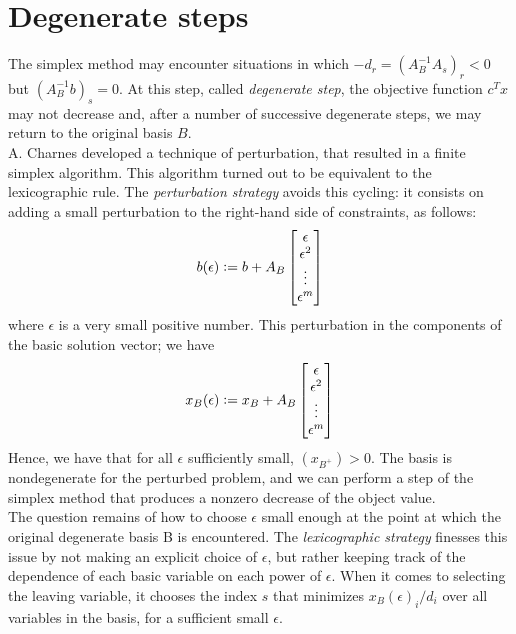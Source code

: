 \documentclass[a4paper,10 pt,titlepage,twoside]{book}
\theoremstyle{plain}
\theoremstyle{definition}
\theoremstyle{remark}
\begin{document}
 \section{Degenerate steps}
The simplex method may encounter situations in which $-d_{r} = \left( A_{B}^{-1}A_{s}\right)_{r} < 0$ but $(A_{B}^{-1}b)_{s}= 0$. At this step, called \textit{degenerate step}, the objective function $c^{T}x$ may not decrease and, after a number of successive degenerate steps, we may return to the original basis $B$. \\
A. Charnes \cite{Lexico2} developed a technique of perturbation, that resulted in a finite simplex algorithm. This algorithm turned out to be equivalent to the lexicographic rule. The \textit{perturbation strategy} avoids this cycling: it consists on adding a small perturbation to the right-hand side of constraints, as follows:
\begin{equation*}
b(\epsilon) \vcentcolon= b + A_{B}
\begin{bmatrix}
\epsilon\\\epsilon^{2}\\\vdots\\\epsilon^{m}
\end{bmatrix}
\end{equation*}
where $\epsilon$ is a very small positive number. This perturbation in the components of the basic solution vector; we have
\begin{equation*}x_{B}(\epsilon) \vcentcolon= x_{B} + A_{B}
\begin{bmatrix}
\epsilon\\\epsilon^{2}\\\vdots\\\epsilon^{m}
\end{bmatrix}
\end{equation*}
Hence, we have that for all $\epsilon$ sufficiently small, $(x_{B^{+}})>0$. The basis is nondegenerate for the perturbed problem, and we can perform a step of the simplex method that produces a nonzero decrease of the object value.\\
The question remains of how to choose $\epsilon$ small enough at the point at which the original degenerate basis B is encountered. The \textit{lexicographic strategy} finesses this issue by not making an explicit choice of $\epsilon$, but rather keeping track of the dependence of each basic variable on each power of $\epsilon$. When it comes to selecting the leaving variable, it chooses the index $s$ that minimizes $x_{B}(\epsilon)_{i}/d_{i}$ over all variables in the basis, for a sufficient small $\epsilon$.\\
\end{document}

